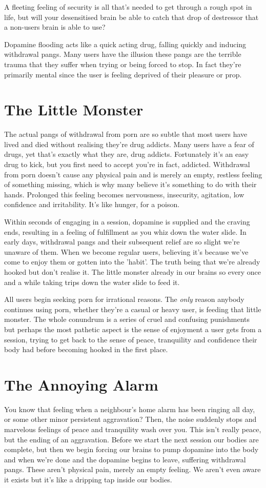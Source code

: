 \documentclass[easypeasy.tex]{subfiles}
\begin{document}
A fleeting feeling of security is all that's needed to get through a rough spot in life, but will your desensitised brain be able to catch that drop of destressor that a non-users brain is able to use?

Dopamine flooding acts like a quick acting drug, falling quickly and inducing withdrawal pangs. Many users have the illusion these pangs are the terrible trauma that they suffer when trying or being forced to stop. In fact they're primarily mental since the user is feeling deprived of their pleasure or prop.

\section{The Little Monster}
The actual pangs of withdrawal from porn are so subtle that most users have lived and died without realising they're drug addicts. Many users have a fear of drugs, yet that's exactly what they are, drug addicts. Fortunately it's an easy drug to kick, but you first need to accept you're in fact, addicted. Withdrawal from porn doesn't cause any physical pain and is merely an empty, restless feeling of something missing, which is why many believe it's something to do with their hands. Prolonged this feeling becomes nervousness, insecurity, agitation, low confidence and irritability. It's like hunger, for a poison.

Within seconds of engaging in a session, dopamine is supplied and the craving ends, resulting in a feeling of fulfillment as you whiz down the water slide. In early days, withdrawal pangs and their subsequent relief are so slight we're unaware of them. When we become regular users, believing it's because we've come to enjoy them or gotten into the 'habit'. The truth being that we're already hooked but don't realise it. The little monster already in our brains so every once and a while taking trips down the water slide to feed it.

All users begin seeking porn for irrational reasons. The \textit{only} reason anybody continues using porn, whether they're a casual or heavy user, is feeding that little monster. The whole conundrum is a series of cruel and confusing punishments but perhaps the most pathetic aspect is the sense of enjoyment a user gets from a session, trying to get back to the sense of peace, tranquility and confidence their body had before becoming hooked in the first place.

\section{The Annoying Alarm}
You know that feeling when a neighbour's home alarm has been ringing all day, or some other minor persistent aggravation? Then, the noise suddenly stops and marvelous feelings of peace and tranquility wash over you. This isn't really peace, but the ending of an aggravation. Before we start the next session our bodies are complete, but then we begin forcing our brains to pump dopamine into the body and when we're done and the dopamine begins to leave, suffering withdrawal pangs. These aren't physical pain, merely an empty feeling. We aren't even aware it exists but it's like a dripping tap inside our bodies.
\end{document}

